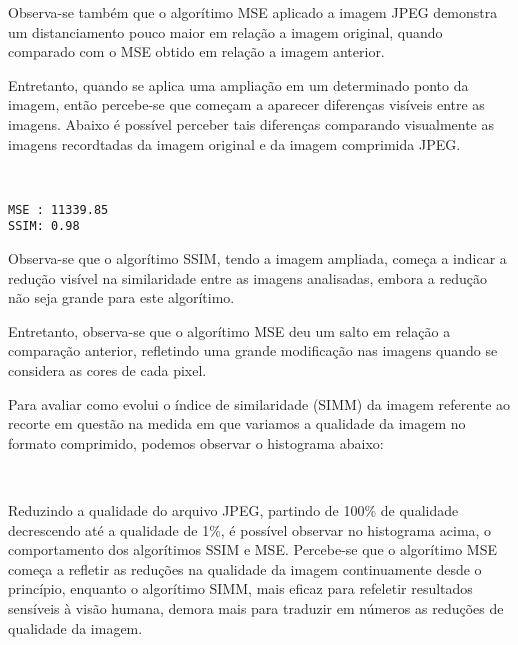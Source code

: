 \documentclass{IEEEtran}
\begin{document}
Observa-se também que o algorítimo MSE aplicado a imagem JPEG demonstra
um distanciamento pouco maior em relação a imagem original, quando
comparado com o MSE obtido em relação a imagem anterior.

Entretanto, quando se aplica uma ampliação em um determinado ponto da
imagem, então percebe-se que começam a aparecer diferenças visíveis
entre as imagens. Abaixo é possível perceber tais diferenças comparando
visualmente as imagens recordtadas da imagem original e da imagem
comprimida JPEG.


    \begin{center}
    \end{center}
    { \hspace*{\fill} \\}
    
    \begin{Verbatim}[commandchars=\\\{\}]
MSE : 11339.85
SSIM: 0.98

    \end{Verbatim}

    Observa-se que o algorítimo SSIM, tendo a imagem ampliada, começa a
indicar a redução visível na similaridade entre as imagens analisadas,
embora a redução não seja grande para este algorítimo.

Entretanto, observa-se que o algorítimo MSE deu um salto em relação a
comparação anterior, refletindo uma grande modificação nas imagens
quando se considera as cores de cada pixel.

    Para avaliar como evolui o índice de similaridade (SIMM) da imagem
referente ao recorte em questão na medida em que variamos a qualidade da
imagem no formato comprimido, podemos observar o histograma abaixo:


    \begin{center}
    \end{center}
    { \hspace*{\fill} \\}
    
    Reduzindo a qualidade do arquivo JPEG, partindo de 100\% de qualidade
decrescendo até a qualidade de 1\%, é possível observar no histograma
acima, o comportamento dos algorítimos SSIM e MSE. Percebe-se que o
algorítimo MSE começa a refletir as reduções na qualidade da imagem
continuamente desde o princípio, enquanto o algorítimo SIMM, mais eficaz
para refeletir resultados sensíveis à visão humana, demora mais para
traduzir em números as reduções de qualidade da imagem.
\end{document}
